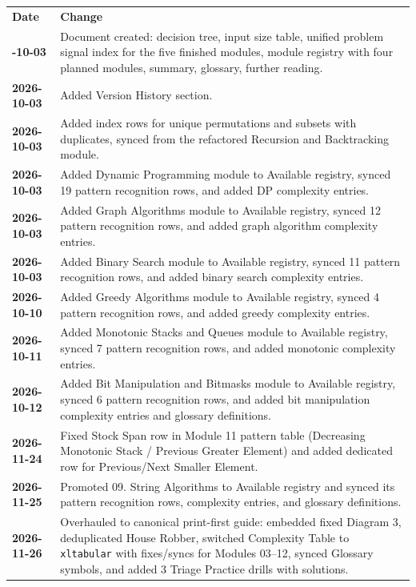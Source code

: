 \documentclass[11pt,a4paper]{article}
\begin{document}
\begin{center}
\begingroup
\footnotesize
{}
\begin{tabularx}{\textwidth}{>{\bfseries}l >{\raggedright\arraybackslash}X}
\arrayrulecolor{primaryblue}\toprule[1.2pt]
\rowcolor{primaryblue!10}
\textcolor{primaryblue}{\textbf{Date}} & \textcolor{primaryblue}{\textbf{Change}} \\
\arrayrulecolor{codeframe}\midrule[0.6pt]
2026-10-03 & Document created: decision tree, input size table, unified problem signal index for the five finished modules, module registry with four planned modules, summary, glossary, further reading. \\
2026-10-03 & Added Version History section. \\
2026-10-03 & Added index rows for unique permutations and subsets with duplicates, synced from the refactored Recursion and Backtracking module. \\
2026-10-03 & Added Dynamic Programming module to Available registry, synced 19 pattern recognition rows, and added DP complexity entries. \\
2026-10-03 & Added Graph Algorithms module to Available registry, synced 12 pattern recognition rows, and added graph algorithm complexity entries. \\
2026-10-03 & Added Binary Search module to Available registry, synced 11 pattern recognition rows, and added binary search complexity entries. \\
2026-10-10 & Added Greedy Algorithms module to Available registry, synced 4 pattern recognition rows, and added greedy complexity entries. \\
2026-10-11 & Added Monotonic Stacks and Queues module to Available registry, synced 7 pattern recognition rows, and added monotonic complexity entries. \\
2026-10-12 & Added Bit Manipulation and Bitmasks module to Available registry, synced 6 pattern recognition rows, and added bit manipulation complexity entries and glossary definitions. \\
2026-11-24 & Fixed Stock Span row in Module 11 pattern table (Decreasing Monotonic Stack / Previous Greater Element) and added dedicated row for Previous/Next Smaller Element. \\
2026-11-25 & Promoted 09. String Algorithms to Available registry and synced its pattern recognition rows, complexity entries, and glossary definitions. \\
2026-11-26 & Overhauled to canonical print-first guide: embedded fixed Diagram 3, deduplicated House Robber, switched Complexity Table to \texttt{xltabular} with fixes/syncs for Modules 03--12, synced Glossary symbols, and added 3 Triage Practice drills with solutions. \\

\end{tabularx}
\end{center}
\end{document}
